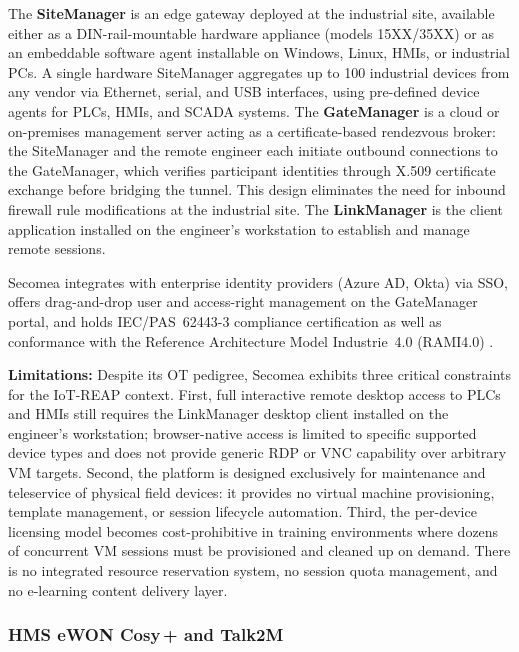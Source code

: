 The \textbf{SiteManager} is an edge gateway deployed at the industrial site,
available either as a DIN-rail-mountable hardware appliance (models 15XX/35XX)
or as an embeddable software agent installable on Windows, Linux, HMIs, or
industrial PCs. A single hardware SiteManager aggregates up to 100 industrial
devices from any vendor via Ethernet, serial, and USB interfaces, using
pre-defined device agents for PLCs, HMIs, and SCADA systems. The
\textbf{GateManager} is a cloud or on-premises management server acting as a
certificate-based rendezvous broker: the SiteManager and the remote engineer
each initiate outbound connections to the GateManager, which verifies participant
identities through X.509 certificate exchange before bridging the tunnel. This
design eliminates the need for inbound firewall rule modifications at the
industrial site. The \textbf{LinkManager} is the client application installed on
the engineer's workstation to establish and manage remote sessions.

Secomea integrates with enterprise identity providers (Azure AD, Okta) via SSO,
offers drag-and-drop user and access-right management on the GateManager portal,
and holds IEC/PAS~62443-3 compliance certification as well as conformance with
the Reference Architecture Model Industrie~4.0 (RAMI4.0)
{\footnotesize\cite{secomea-security-audit}}.

\textbf{Limitations:} Despite its OT pedigree, Secomea exhibits three critical
constraints for the IoT-REAP context. First, full interactive remote desktop
access to PLCs and HMIs still requires the LinkManager desktop client installed
on the engineer's workstation; browser-native access is limited to specific
supported device types and does not provide generic RDP or VNC capability over
arbitrary VM targets. Second, the platform is designed exclusively for
maintenance and teleservice of physical field devices: it provides no virtual
machine provisioning, template management, or session lifecycle automation.
Third, the per-device licensing model becomes cost-prohibitive in training
environments where dozens of concurrent VM sessions must be provisioned and
cleaned up on demand. There is no integrated resource reservation system, no
session quota management, and no e-learning content delivery layer.

\subsubsection{HMS eWON Cosy\,+ and Talk2M}

